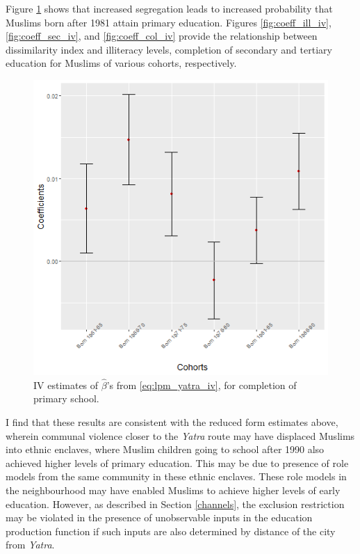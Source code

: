 \documentclass{article}
\begin{document}
Figure \ref{fig:coeff_pri_iv} shows that increased segregation leads to increased probability that Muslims born after 1981 attain primary education. Figures \ref{fig:coeff_ill_iv}, \ref{fig:coeff_sec_iv}, and \ref{fig:coeff_col_iv} provide the relationship between dissimilarity index and illiteracy levels, completion of secondary and tertiary education for Muslims of various cohorts, respectively. 

\begin{figure}[H]
    \centering
    \includegraphics[scale = 0.6]{images/graph_coeff_pri_iv.png}
    \caption{IV estimates of $\hat{\beta}$'s from \eqref{eq:lpm_yatra_iv}, for completion of primary school.}
    \label{fig:coeff_pri_iv}
\end{figure}

I find that these results are consistent with the reduced form estimates above, wherein communal violence closer to the \textit{Yatra} route may have displaced Muslims into ethnic enclaves, where Muslim children going to school after 1990 also achieved higher levels of primary education. This may be due to presence of role models from the same community in these ethnic enclaves. These role models in the neighbourhood may have enabled Muslims to achieve higher levels of early education. However, as described in Section \ref{channels}, the exclusion restriction may be violated in the presence of unobservable inputs in the education production function if such inputs are also determined by distance of the city from \textit{Yatra}. 
\end{document}
